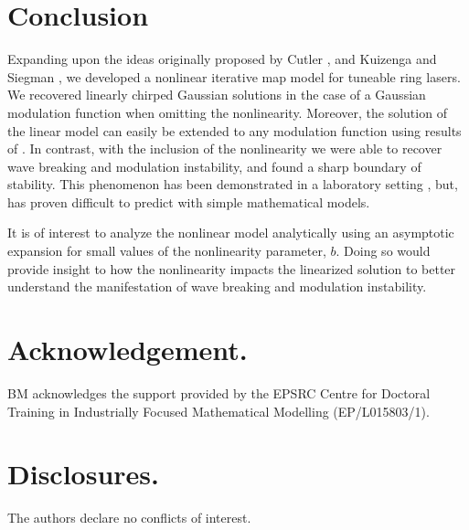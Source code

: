\documentclass[9pt,twocolumn,twoside]{osajnl}
\begin{document}
\section{Conclusion}
\label{sec:conclusion}
Expanding upon the ideas originally proposed by Cutler \cite{cutler1955}, and Kuizenga and Siegman \cite{kuizenga1970, kuizenga1970a, siegman1969}, we developed a nonlinear iterative map model for tuneable ring lasers. We recovered linearly chirped Gaussian solutions in the case of a Gaussian modulation function when omitting the nonlinearity. Moreover, the solution of the linear model can easily be extended to any modulation function using results of \cite{calcaterra2008a}. In contrast, with the inclusion of the nonlinearity we were able to recover wave breaking and modulation instability, and found a sharp boundary of stability. This phenomenon has been demonstrated in a laboratory setting \cite{agrawal2013, anderson1992, finot2008, rothenberg1989b, tomlinson1985}, but, has proven difficult to predict with simple mathematical models.

It is of interest to analyze the nonlinear model analytically using an asymptotic expansion for small values of the nonlinearity parameter, $b$. Doing so would provide insight to how the nonlinearity impacts the linearized solution to better understand the manifestation of wave breaking and modulation instability.

\section*{Acknowledgement.}
BM acknowledges the support provided by the EPSRC Centre for Doctoral Training in Industrially Focused Mathematical Modelling (EP/L015803/1).

\section*{Disclosures.}
The authors declare no conflicts of interest.


\end{document}
